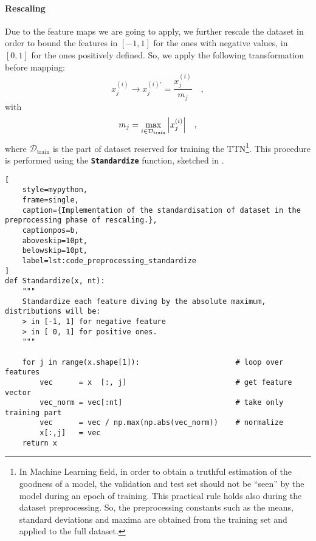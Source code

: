 \documentclass[../main/main.tex]{subfiles}
\begin{document}
\paragraph{Rescaling}
Due to the feature maps we are going to apply, we further rescale the dataset in order to bound the features in \( [-1,1] \) for the ones with negative values, in \( [0,1] \) for the ones positively defined. So, we apply the following transformation before mapping:
\begin{equation}
    x^{(i)}_{j}
    \longrightarrow
    x^{(i)\prime}_{j}
    =
    \frac{x^{(i)}_{j}}{m_j}
    \quad ,
\end{equation}
with
\begin{equation}
    m_{j}
    =
    \max_{i\in \mathcal{D}_{\mathrm{train}}} \abs{x^{(i)}_{j}}
    \quad ,
\end{equation}
where \( \mathcal{D}_{\mathrm{train}} \) is the part of dataset reserved for training the TTN\footnote{In Machine Learning field, in order to obtain a truthful estimation of the goodness of a model, the validation and test set should not be ``seen'' by the model during an epoch of training. This practical rule holds also during the dataset preprocessing. So, the preprocessing constants such as the means, standard deviations and maxima are obtained from the training set and applied to the full dataset.}. This procedure is performed using the \texttt{\bfseries Standardize} function, sketched in .

\begin{lstlisting}[
    style=mypython,
    frame=single,
    caption={Implementation of the standardisation of dataset in the preprocessing phase of rescaling.},
    captionpos=b,
    aboveskip=10pt,
    belowskip=10pt,
    label=lst:code_preprocessing_standardize
]
def Standardize(x, nt):
    """
    Standardize each feature diving by the absolute maximum, distributions will be:
    > in [-1, 1] for negative feature
    > in [ 0, 1] for positive ones.
    """
    
    for j in range(x.shape[1]):                      # loop over features
        vec      = x  [:, j]                         # get feature vector
        vec_norm = vec[:nt]                          # take only training part
        vec      = vec / np.max(np.abs(vec_norm))    # normalize
        x[:,j]   = vec 
    return x
\end{lstlisting}
\end{document}
